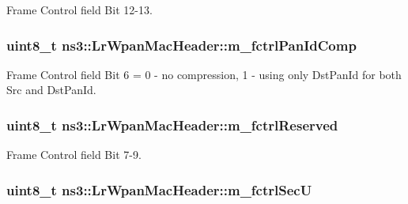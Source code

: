 Frame Control field Bit 12-\/13. 

\subsubsection[{\texorpdfstring{m\+\_\+fctrl\+Pan\+Id\+Comp}{m_fctrlPanIdComp}}]{\setlength{\rightskip}{0pt plus 5cm}uint8\+\_\+t ns3\+::\+Lr\+Wpan\+Mac\+Header\+::m\+\_\+fctrl\+Pan\+Id\+Comp\hspace{0.3cm}{\ttfamily [private]}}\hypertarget{classns3_1_1LrWpanMacHeader_a46220e38f87383fd1003ae6dbd48b38a}{}\label{classns3_1_1LrWpanMacHeader_a46220e38f87383fd1003ae6dbd48b38a}


Frame Control field Bit 6 = 0 -\/ no compression, 1 -\/ using only Dst\+Pan\+Id for both Src and Dst\+Pan\+Id. 

\subsubsection[{\texorpdfstring{m\+\_\+fctrl\+Reserved}{m_fctrlReserved}}]{\setlength{\rightskip}{0pt plus 5cm}uint8\+\_\+t ns3\+::\+Lr\+Wpan\+Mac\+Header\+::m\+\_\+fctrl\+Reserved\hspace{0.3cm}{\ttfamily [private]}}\hypertarget{classns3_1_1LrWpanMacHeader_a118e2d3b65d95ba32c2214d814153bc0}{}\label{classns3_1_1LrWpanMacHeader_a118e2d3b65d95ba32c2214d814153bc0}


Frame Control field Bit 7-\/9. 

\subsubsection[{\texorpdfstring{m\+\_\+fctrl\+SecU}{m_fctrlSecU}}]{\setlength{\rightskip}{0pt plus 5cm}uint8\+\_\+t ns3\+::\+Lr\+Wpan\+Mac\+Header\+::m\+\_\+fctrl\+SecU\hspace{0.3cm}{\ttfamily [private]}}\hypertarget{classns3_1_1LrWpanMacHeader_af43e4ab6a588dc7ce311c8f4be7b8973}{}\label{classns3_1_1LrWpanMacHeader_af43e4ab6a588dc7ce311c8f4be7b8973}


